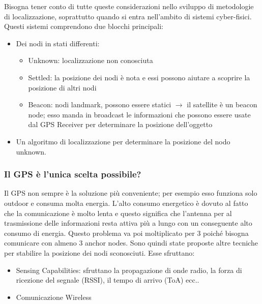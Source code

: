         Bisogna tener conto di tutte queste considerazioni nello sviluppo di
metodologie di localizzazione, soprattutto quando si entra nell'ambito di
sistemi cyber-fisici.
        Questi sistemi comprendono due blocchi principali:
        \begin{itemize}
                \item Dei nodi in stati differenti:
                \begin{itemize}
                        \item Unknown: localizzazione non conosciuta
                        \item Settled: la posizione dei nodi è nota e essi
possono aiutare a scoprire la posizione di altri nodi
                        \item Beacon: nodi landmark, possono essere statici
$\rightarrow$ il satellite è un beacon node; esso manda in broadcast le
informazioni che possono essere usate dal GPS Receiver per determinare la
posizione dell'oggetto
                \end{itemize}
                \item Un algoritmo di localizzazione per determinare la
posizione del nodo unknown.
        \end{itemize}

                \subsubsection{Il GPS è l'unica scelta
possibile?}\label{subsubsec3.1.1}
                Il GPS non sempre è la soluzione più conveniente; per esempio
esso funziona solo outdoor e consuma molta energia. L'alto consumo energetico è
dovuto al fatto che la comunicazione è molto lenta e questo significa che
l'antenna per al trasmissione delle informazioni resta attiva più a lungo con un
conseguente alto consumo di energia. Questo problema va poi moltiplicato per 3
poiché bisogna comunicare con almeno 3 anchor nodes.
                Sono quindi state proposte altre tecniche per stabilire la
posizione dei nodi sconosciuti. Esse sfruttano:
                \begin{itemize}
                        \item Sensing Capabilities: sfruttano la propagazione di
onde radio, la forza di ricezione del segnale (RSSI), il tempo di arrivo (ToA)
ecc..
                        \item Comunicazione Wireless
                \end{itemize}

